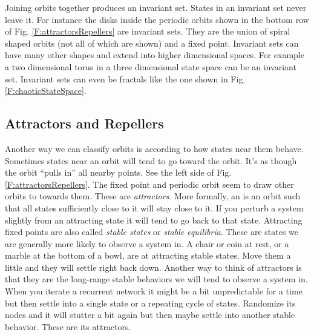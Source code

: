    Joining orbits together produces an invariant set.  States in an invariant
set never leave it.  For instance the disks inside the periodic orbits shown in
the bottom row of Fig. \ref{F:attractorsRepellers} are invariant sets.  They
are the union of spiral shaped orbits (not all of which are shown) and a fixed 
point.  Invariant sets can have many other shapes and extend into higher 
dimensional spaces.  For example a two dimensional torus in a three dimensional 
state space can be an invariant set.  
Invariant sets can even be fractals like the one shown in Fig. \ref{F:chaoticStateSpace}.



\subsection{Attractors and Repellers}

   Another way we can classify orbits is according to how states near  them behave. Sometimes states near an orbit will tend to  go toward the orbit. It's as though the orbit ``pulls in'' all nearby points. See the left side of Fig. \ref{F:attractorsRepellers}. The fixed point and periodic orbit seem to draw other orbits to towards them. These are \emph{attractors}. More formally, an  is an orbit such that all states sufficiently close to it will stay close to it. If you perturb a system slightly from an attracting state it will tend to go back to that state. Attracting fixed points are also called \emph{stable states} or \emph{stable equilibria}. These are states we are generally more likely to observe a system in. A chair or coin at rest, or a marble at the bottom of a bowl, are at attracting stable states. Move them a little and they will settle right back down. Another way to think of attractors is that they are the long-range stable behaviors we will tend to observe a system in. When you iterate a recurrent network it might be a bit unpredictable for a time but then settle into a single state or a repeating cycle of states. Randomize its nodes and it will stutter a bit again but then maybe settle into another stable behavior. These are its attractors.


